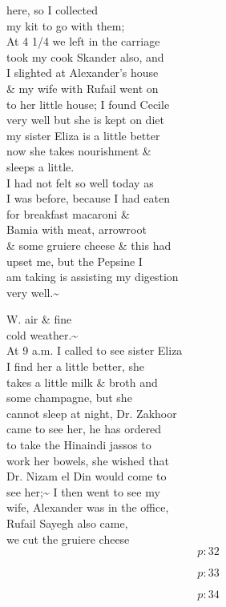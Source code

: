 \documentclass{report}
\begin{document}


	\par{
 	here, so I collected\ \\my kit to go with them;\ \\At 4 1/4 we left in the carriage\ \\took my cook Skander also, and\ \\I slighted at Alexander's house\ \\\& my wife with Rufail went on\ \\to her little house; I found Cecile\ \\very well but she is kept on diet\ \\my sister Eliza is a little better\ \\now she takes nourishment \&\ \\sleeps a little.\ \\I had not felt so well today as\ \\I was before, because I had eaten\ \\for breakfast macaroni \&\ \\Bamia with meat, arrowroot\ \\\& some gruiere cheese \& this had\ \\upset me, but the Pepsine I\ \\am taking is assisting my digestion\ \\very well.\~{}\ \\
	}


	\par{
 	W. air \& fine\ \\cold weather.\~{}\ \\At 9 a.m. I called to see sister Eliza\ \\I find her a little better, she\ \\takes a little milk \& broth and\ \\some champagne, but she\ \\cannot sleep at night, Dr. Zakhoor\ \\came to see her, he has ordered\ \\to take the Hinaindi jassos to\ \\work her bowels, she wished that\ \\Dr. Nizam el Din would come to\ \\see her;\~{} I then went to see my\ \\wife, Alexander was in the office,\ \\Rufail Sayegh also came,\ \\we cut the gruiere cheese\ \\
  \[p: 32 \]

  \[p: 33 \]

  \[p: 34 \]

	}
\end{document}
